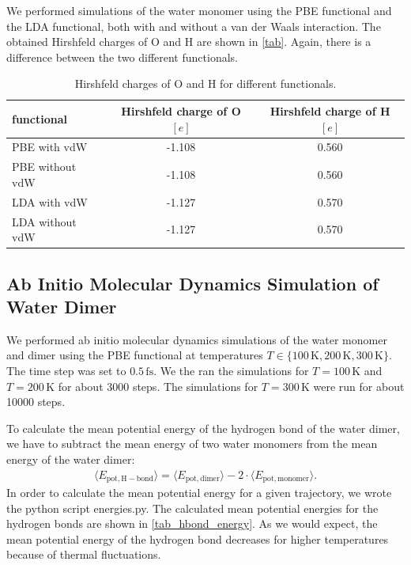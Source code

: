 \documentclass[a4paper,10pt,bibtotoc]{scrartcl}
\begin{document}
\noindent We performed simulations of the water monomer using the PBE functional and the LDA functional, both with and without a van der Waals interaction. 
The obtained Hirshfeld charges of O and H are shown in \autoref{tab}.
Again, there is a difference between the two different functionals.

\begin{table}[h]
\centering
\caption{Hirshfeld charges of O and H for different functionals.}
\begin{tabular}{@{}lcc@{}}
\toprule
functional & Hirshfeld charge of O $\left[e\right]$ & Hirshfeld charge of H $\left[e\right]$ \\ \midrule
PBE with vdW       & -1.108 & 0.560                 \\
PBE without vdW       & -1.108 & 0.560            \\
LDA with vdW       & -1.127 & 0.570              \\ 
LDA without vdW & -1.127 & 0.570\\\bottomrule
\end{tabular}
\label{tab}
\end{table}

\subsection{Ab Initio Molecular Dynamics Simulation of Water Dimer}
We performed ab initio molecular dynamics simulations of the water monomer and dimer using the PBE functional at temperatures $T\in\{100\,\mathrm{K}, 200\,\mathrm{K}, 300\,\mathrm{K}\}$. 
The time step was set to $0.5\,\mathrm{fs}$. 
We the ran the simulations for $T=100\,\mathrm{K}$ and $T=200\,\mathrm{K}$ for about 3000 steps.
The simulations for $T=300\,\mathrm{K}$ were run for about 10000 steps.

To calculate the mean potential energy of the hydrogen bond of the water dimer, we have to subtract the mean energy of two water monomers from the mean energy of the water dimer:
\begin{align}
\langle E_\mathrm{pot,H-bond}\rangle = \langle E_\mathrm{pot,dimer}\rangle - 2\cdot \langle E_\mathrm{pot,monomer}\rangle .
\end{align}
In order to calculate the mean potential energy for a given trajectory, we wrote the python script energies.py. 
The calculated mean potential energies for the hydrogen bonds are shown in \autoref{tab_hbond_energy}.
As we would expect, the mean potential energy of the hydrogen bond decreases for higher temperatures because of thermal fluctuations.
\end{document}
